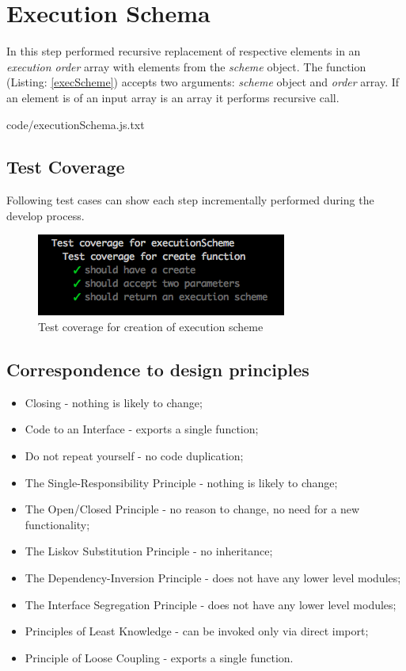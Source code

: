 \section{Execution Schema}
In this step performed recursive replacement of respective elements in an \textit{execution order} array with elements from the \textit{scheme} object. The function (Listing: \ref{execScheme}) accepts two arguments: \textit{scheme} object and \textit{order} array. If an element is of an input array is an array it performs recursive call.


{code/executionSchema.js.txt}
\subsection{Test Coverage}
Following test cases can show each step incrementally performed during the develop process.
\begin{figure}[H]
	\centering
	\includegraphics[width=\linewidth]{grafiken/testCreate.png}
	\caption{Test coverage for creation of execution scheme}
	\label{fig:testCreate}
\end{figure}

\subsection{Correspondence to design principles}
\begin{itemize}
	\item Closing - nothing is likely to change;
	\item Code to an Interface - exports a single function;
	\item Do not repeat yourself - no code duplication;
	\item The Single-Responsibility Principle - nothing is likely to change;
	\item The Open/Closed Principle - no reason to change, no need for a new functionality;
	\item The Liskov Substitution Principle - no inheritance;
	\item The Dependency-Inversion Principle - does not have any lower level modules;
	\item The Interface Segregation Principle - does not have any lower level modules;
	\item Principles of Least Knowledge -  can be invoked only via direct import;
	\item Principle of Loose Coupling - exports a single function.
\end{itemize}

